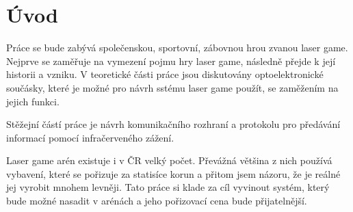 \chapter*{Úvod}
{}


Práce se bude zabývá společenskou, sportovní, zábovnou hrou zvanou laser game. Nejprve se zaměřuje na vymezení pojmu hry laser game, následně přejde k její historii a vzniku. V teoretické části práce jsou diskutovány optoelektronické součásky, které je možné pro návrh sstému laser game použít, se zaměžením na jejich funkci.

Stěžejní částí práce je návrh komunikačního rozhraní a protokolu pro předávání informací pomocí infračerveného zážení.

Laser game arén existuje i v ČR velký počet. Převážná většina z nich používá vybavení, které se pořizuje za statisíce korun a přitom jsem názoru, že je reálné jej vyrobit mnohem levněji. Tato práce si klade za cíl vyvinout systém, který bude možné nasadit v arénách a jeho pořizovací cena bude přijatelnější.
